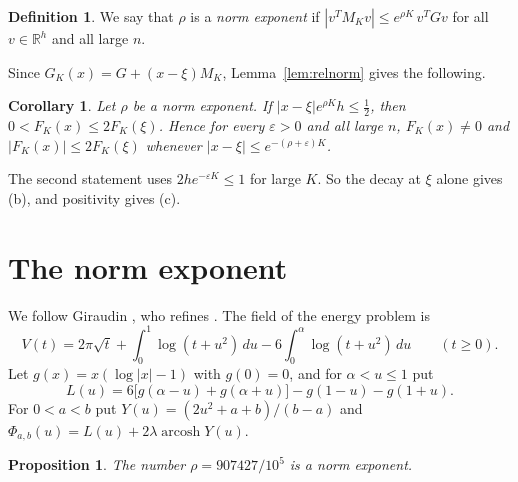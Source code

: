 \documentclass[11pt]{amsart}
\newtheorem{proposition}[theorem]{Proposition}
\newtheorem{corollary}[theorem]{Corollary}
\theoremstyle{definition}
\newtheorem{definition}[theorem]{Definition}
\theoremstyle{remark}
\numberwithin{equation}{section}
\newcommand{\R}{\mathbb R}
\newcommand{\arcosh}{\operatorname{arcosh}}
\begin{document}
\begin{definition}
We say that $\rho$ is a \emph{norm exponent} if $|v^TM_Kv|\le e^{\rho K}\,v^TGv$ for all $v\in\R^h$ and all large $n$.
\end{definition}

Since $G_K(x)=G+(x-\xi)M_K$, Lemma~\ref{lem:relnorm} gives the following.

\begin{corollary}\label{cor:nearby}
Let $\rho$ be a norm exponent. If $|x-\xi|e^{\rho K}h\le\frac12$, then $0<F_K(x)\le2F_K(\xi)$. Hence for every
$\varepsilon>0$ and all large $n$, $F_K(x)\ne0$ and $|F_K(x)|\le2F_K(\xi)$ whenever $|x-\xi|\le e^{-(\rho+\varepsilon)K}$.
\end{corollary}

The second statement uses $2he^{-\varepsilon K}\le1$ for large $K$. So the decay at $\xi$ alone gives (b), and
positivity gives (c).

\section{The norm exponent}\label{sec:rho}

We follow Giraudin \cite{Giraudin26z5}, who refines \cite[Proposition~C.1]{Fauzan2026}. The field of the energy problem
is
\begin{equation}\label{eq:field}
 V(t)=2\pi\sqrt t+\int_0^1\log(t+u^2)\,du-6\int_0^\alpha\log(t+u^2)\,du\qquad(t\ge0).
\end{equation}
Let $g(x)=x(\log|x|-1)$ with $g(0)=0$, and for $\alpha<u\le1$ put
\[
 L(u)=6\bigl[g(\alpha-u)+g(\alpha+u)\bigr]-g(1-u)-g(1+u).
\]
For $0<a<b$ put $Y(u)=(2u^2+a+b)/(b-a)$ and $\Phi_{a,b}(u)=L(u)+2\lambda\arcosh Y(u)$.

\begin{proposition}\label{prop:rho}
The number $\rho=907427/10^5$ is a norm exponent.
\end{proposition}
\end{document}
